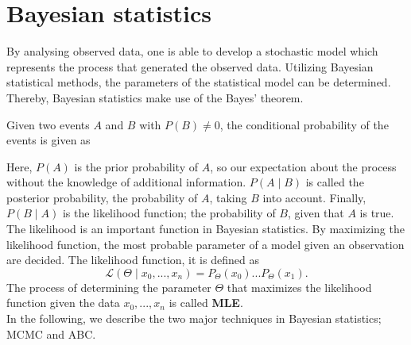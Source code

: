 \section{Bayesian statistics} 
\label{section:Baystat}
By analysing observed data, one is able to develop a stochastic model which represents the process that generated the observed data. Utilizing Bayesian statistical methods, the parameters of the statistical model can be determined. Thereby, Bayesian statistics make use of the Bayes' theorem\cite{BayStat}.\newline
\begin{definition}
Given two events $A$ and $B$ with $P(B) \neq 0$, the conditional probability of the events is given as\\
\end{definition}
Here, $P(A)$ is the prior probability of $A$, so our expectation about the process without the knowledge of additional information. $P(A \mid B)$ is called the posterior probability, the probability of $A$, taking $B$ into account. Finally, $P(B \mid A)$ is the likelihood function; the probability of $B$, given that $A$ is true.\newline
The likelihood is an important function in Bayesian statistics. By maximizing the likelihood function, the most probable parameter of a model given an observation are decided. The likelihood function, it is defined as 
\begin{equation}
\mathcal{L}(\Theta \mid x_0,...,x_n) = P_{\Theta}(x_0) ... P_{\Theta}(x_1).
\end{equation}
The process of determining the parameter $\Theta$ that maximizes the likelihood function given the data ${x_0,...,x_n}$ is called \textbf{\acf{MLE}}.\\

In the following, we describe the two major techniques in Bayesian statistics; \acf{MCMC} and \acf{ABC}.\\

